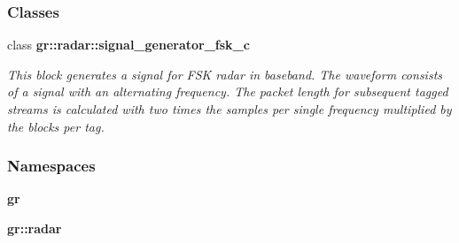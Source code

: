 \subsubsection*{Classes}
\begin{DoxyCompactItemize}
\item 
class {\bf gr\+::radar\+::signal\+\_\+generator\+\_\+fsk\+\_\+c}
\begin{DoxyCompactList}\small\item\em This block generates a signal for F\+SK radar in baseband. The waveform consists of a signal with an alternating frequency. The packet length for subsequent tagged streams is calculated with two times the samples per single frequency multiplied by the blocks per tag. \end{DoxyCompactList}\end{DoxyCompactItemize}
\subsubsection*{Namespaces}
\begin{DoxyCompactItemize}
\item 
 {\bf gr}
\item 
 {\bf gr\+::radar}
\end{DoxyCompactItemize}
